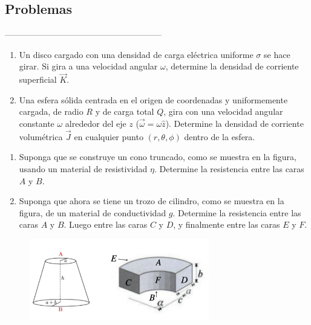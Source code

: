 \subsection{Problemas}
--------------------------------------------------------
\\

\np

\begin{enumerate}[label=\alph*)]
    \item Un disco cargado con una densidad de carga eléctrica uniforme $\sigma$ se hace girar. Si gira a una velocidad angular $\omega$, determine la densidad de corriente superficial $\Vec{K}$.
    \item Una esfera sólida centrada en el origen de coordenadas y uniformemente cargada, de radio $R$ y de carga total $Q$, gira con una velocidad angular constante $\omega$ alrededor del eje $z$ ($\Vec{\omega}=\omega\hat{z}$). Determine la densidad de corriente volumétrica $\Vec{J}$ en cualquier punto $(r, \theta, \phi)$ dentro de la esfera.
\end{enumerate}

\bigbreak

\np

\begin{enumerate}[label=\alph*)]
    \item Suponga que se construye un cono truncado, como se muestra en la figura, usando un material de resistividad $\eta$. Determine la resistencia entre las caras $A$ y $B$.
    \item  Suponga que ahora se tiene un trozo de cilindro, como se muestra en la figura, de un material de conductividad $g$. Determine la resistencia entre las caras $A$ y $B$. Luego entre las caras $C$ y $D$, y finalmente entre las caras $E$ y $F$.
\end{enumerate}

\begin{figure}[H]
    \centering
    \includegraphics[width=0.7\textwidth]{Corriente/Imagen1.jpeg}
\end{figure}

